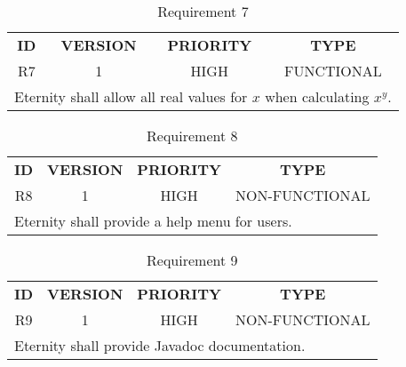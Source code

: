 \documentclass[11pt,a4paper]{report}
\theoremstyle{definition}
\theoremstyle{remark}
\begin{document}
            \begin{table}[ht]
            \centering
                \begin{tabular}{cccc} %
                    \textbf{ID} & \textbf{VERSION} & \textbf{PRIORITY} & \textbf{TYPE}\\
                            R7  &           1      &           HIGH    &      FUNCTIONAL\\
                    \hline
                    \multicolumn{4}{l}{Eternity shall allow all real values for $x$ when calculating $x^y$.}
                \end{tabular}
                \caption{Requirement 7}
                \label{tab:table-requirements-7}
            \end{table}
            \vspace{3em}
            
            \begin{table}[ht]
            \centering
                \begin{tabular}{cccc} %
                    \textbf{ID} & \textbf{VERSION} & \textbf{PRIORITY} & \textbf{TYPE}\\
                            R8  &           1      &           HIGH    &      NON-FUNCTIONAL\\
                    \hline
                    \multicolumn{4}{l}{Eternity shall provide a help menu for users.}
                \end{tabular}
                \caption{Requirement 8}
                \label{tab:table-requirements-8}
            \end{table}
            \vspace{3em}
            
            \begin{table}[ht]
            \centering
                \begin{tabular}{cccc} %
                    \textbf{ID} & \textbf{VERSION} & \textbf{PRIORITY} & \textbf{TYPE}\\
                            R9  &           1      &           HIGH    &      NON-FUNCTIONAL\\
                    \hline
                    \multicolumn{4}{l}{Eternity shall provide Javadoc documentation.}
                \end{tabular}
                \caption{Requirement 9}
                \label{tab:table-requirements-9}
            \end{table}
            \vspace{3em}
            
\end{document}
